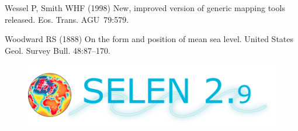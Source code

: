 \documentclass[11pt,fleqn,a4paper,titlepage]{article}
\newcommand\selen{\textsf{SELEN~}}
\newcommand\eos{Eos. Trans. AGU~}
\begin{document}
\begin{thebibliography}{99}
Wessel P, Smith WHF (1998)   
New, improved version of generic mapping tools released. 
\eos 79:579.

Woodward RS (1888) 
On the form and position of mean sea level.  
United States Geol. Survey Bull. 48:87--170. 


\end{thebibliography}

\clearpage

\begin{figure}[h]
\begin{center}
\vspace{6cm}
\includegraphics[angle=0,width=1\textwidth]{./Figures/logo_SELEN29.png}
\vspace{0cm}
\end{center} 
\end{figure}
\end{document}
